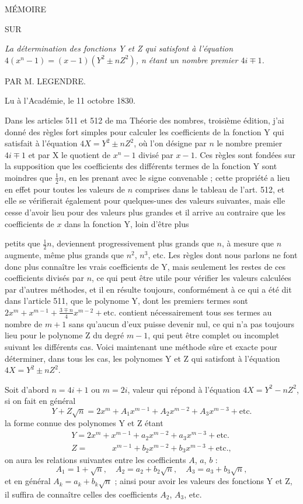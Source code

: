 \documentclass[11pt,a4paper]{article}
\begin{document}
MÉMOIRE

SUR

\emph{La détermination des fonctions Y et Z qui satisfont à l'équation
$4(x^n - 1) = (x - 1)(Y^2 \pm nZ^2)$, n étant un nombre premier
$4i \mp 1$.}

PAR M. LEGENDRE.

Lu à l'Académie, le 11 octobre 1830.

Dans les articles 511 et 512 de ma Théorie des nombres, troisième édition,
j'ai donné des règles fort simples pour calculer les coefficients de la
fonction Y qui satisfait à l'équation $4X = Y^2 \pm nZ^2$, où l'on désigne
par $n$ le nombre premier $4i \mp 1$ et par X le quotient de $x^n - 1$
divisé par $x - 1$. Ces règles sont fondées sur la supposition que les
coefficients des différents termes de la fonction Y sont moindres que
$\frac{1}{2}n$, en les prenant avec le signe convenable ; cette propriété a
lieu en effet pour toutes les valeurs de $n$ comprises dans le tableau de
l'art. 512, et elle se vérifierait également pour quelques-unes des valeurs
suivantes, mais elle cesse d'avoir lieu pour des valeurs plus grandes et il
arrive au contraire que les coefficients de $x$ dans la fonction Y, loin
d'être plus


petits que $\frac{1}{2}n$, deviennent progressivement plus grands que $n$,
à mesure que $n$ augmente, même plus grands que $n^2$, $n^3$, etc. Les
règles dont nous parlons ne font donc plus connaître les vrais coefficients
de Y, mais seulement les restes de ces coefficients divisés par $n$, ce qui
peut être utile pour vérifier les valeurs calculées par d'autres méthodes,
et il en résulte toujours, conformément à ce qui a été dit dans l'article
511, que le polynome Y, dont les premiers termes sont
$2x^m + x^{m-1} + \frac{3 \mp n}{4}x^{m-2} + \text{etc.}$ contient
nécessairement tous ses termes au nombre de $m + 1$ sans qu'aucun d'eux
puisse devenir nul, ce qui n'a pas toujours lieu pour le polynome Z du
degré $m - 1$, qui peut être complet ou incomplet suivant les différents
cas. Voici maintenant une méthode sûre et exacte pour déterminer, dans tous
les cas, les polynomes Y et Z qui satisfont à l'équation
$4X = Y^2 \pm nZ^2$.

Soit d'abord $n = 4i + 1$ ou $m = 2i$, valeur qui répond à l'équation
$4X = Y^2 - nZ^2$, si on fait en général
\[
Y + Z\sqrt{n} = 2x^m + A_1 x^{m-1} + A_2 x^{m-2} + A_3 x^{m-3} + \text{etc.}
\]
la forme connue des polynomes Y et Z étant
\[
\begin{array}{l}
Y = 2x^m + x^{m-1} + a_2 x^{m-2} + a_3 x^{m-3} + \text{etc.} \\
Z = \phantom{2x^m + {}} x^{m-1} + b_2 x^{m-2} + b_3 x^{m-3} + \text{etc.},
\end{array}
\]
on aura les relations suivantes entre les coefficients $A$, $a$, $b$ :
\[
A_1 = 1 + \sqrt{n}, \quad A_2 = a_2 + b_2\sqrt{n}, \quad A_3 = a_3 + b_3\sqrt{n},
\]
et en général $A_k = a_k + b_k\sqrt{n}$ ; ainsi pour avoir les valeurs des
fonctions Y et Z, il suffira de connaître celles des coefficients $A_2$,
$A_3$, etc.
\end{document}
